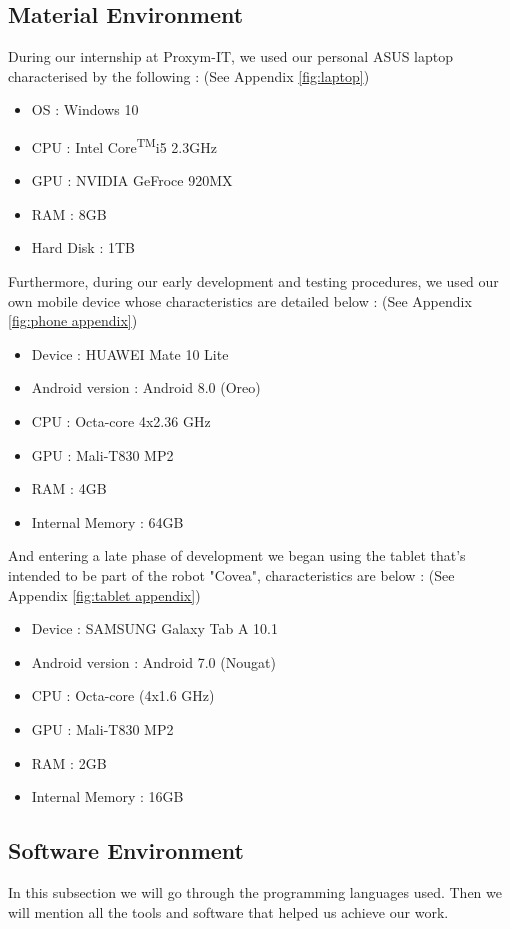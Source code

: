 \subsection{Material Environment}
During our internship at Proxym-IT, we used our personal ASUS laptop characterised by the following : (See Appendix \ref{fig:laptop})
\begin{itemize}
    \item OS : Windows 10
    \item CPU : Intel\textsuperscript{\textregistered} Core\textsuperscript{TM}i5 2.3GHz
    \item GPU : NVIDIA\textsuperscript{\textregistered} GeFroce\textsuperscript{\textregistered} 920MX
    \item RAM : 8GB
    \item Hard Disk : 1TB
\end{itemize}
Furthermore, during our early development and testing procedures, we used our own mobile device whose characteristics are detailed below : (See Appendix \ref{fig:phone appendix})
\begin{itemize}
    \item Device : HUAWEI Mate 10 Lite
    \item Android version : Android 8.0 (Oreo)
    \item CPU : Octa-core 4x2.36 GHz
    \item GPU : Mali-T830 MP2
    \item RAM : 4GB
    \item Internal Memory : 64GB
\end{itemize}
And entering a late phase of development we began using the tablet that's intended to be part of the robot "Covea", characteristics are below : (See Appendix \ref{fig:tablet appendix})
\begin{itemize}
    \item Device : SAMSUNG Galaxy Tab A 10.1
    \item Android version : Android 7.0 (Nougat)
    \item CPU : Octa-core (4x1.6 GHz)
    \item GPU : Mali-T830 MP2
    \item RAM : 2GB
    \item Internal Memory : 16GB 
\end{itemize}
\subsection{Software Environment}
In this subsection we will go through the programming languages used. Then we will mention all the tools and software that helped us achieve our work.
